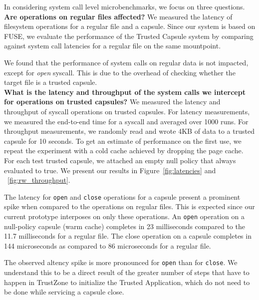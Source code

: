 In considering system call level microbenchmarks, we focus on three
questions.\\

\textbf{Are operations on regular files affected?} 
We measured the latency of filesystem operations for a regular file and a capsule. Since our system is based on FUSE, we evaluate the performance of the Trusted Capsule system by comparing against system call latencies for a regular file on the same mountpoint.

We found that the performance of system calls on regular data is not impacted, except for \textit{open} syscall. 
This is due to the overhead of checking whether the target file is a trusted capsule. \\

\textbf{What is the latency and throughput of the system calls we
  intercept for operations on trusted capsules?} We measured the
latency and throughput of syscall operations on trusted capsules.  For
latency measurements, we measured the end-to-end time for a syscall
and averaged over 1000 runs.  For throughput measurements, we randomly
read and wrote 4KB of data to a trusted capsule for 10 seconds. To get an estimate of performance on the first use, we repeat the experiment with a cold cache achieved by dropping the page cache. 
For each test trusted capsule, we attached an empty null policy that always evaluated to true.  We present our results in Figure~\ref{fig:latencies} and ~\ref{fig:rw_throughput}.

The latency for \texttt{open} and \texttt{close} operations for a capsule present a prominent spike when compared to the operations on regular files. This is expected since our current prototype interposes on only these operations. An \texttt{open} operation on a null-policy capsule (warm cache) completes in 23 milliseconds compared to the 11.7 milliseconds for a regular file. The close operation on a capsule completes in  144 microseconds as compared to  86 microseconds for a regular file. 

The observed altency spike is more pronounced for \texttt{open} than for \texttt{close}. We understand this to be a direct result of the greater number of steps that have to happen in TrustZone to initialize the Trusted Application, which do not need to be done  while servicing a capsule close. 

